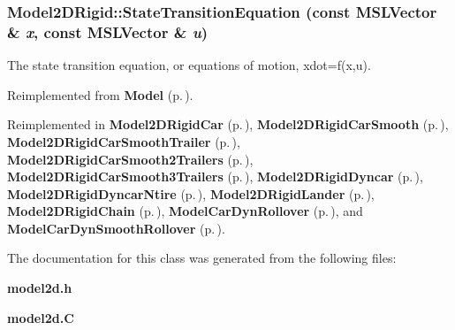 \subsubsection{ Model2DRigid::State\-Transition\-Equation (const {\bf MSLVector} \& {\em x}, const {\bf MSLVector} \& {\em u})\hspace{0.3cm}{\tt  [virtual]}}\label{classModel2DRigid_a3}


The state transition equation, or equations of motion, xdot=f(x,u).



Reimplemented from {\bf Model} {\rm (p.\,\pageref{classModel_a3})}.

Reimplemented in {\bf Model2DRigid\-Car} {\rm (p.\,\pageref{classModel2DRigidCar_a2})}, {\bf Model2DRigid\-Car\-Smooth} {\rm (p.\,\pageref{classModel2DRigidCarSmooth_a2})}, {\bf Model2DRigid\-Car\-Smooth\-Trailer} {\rm (p.\,\pageref{classModel2DRigidCarSmoothTrailer_a2})}, {\bf Model2DRigid\-Car\-Smooth2Trailers} {\rm (p.\,\pageref{classModel2DRigidCarSmooth2Trailers_a2})}, {\bf Model2DRigid\-Car\-Smooth3Trailers} {\rm (p.\,\pageref{classModel2DRigidCarSmooth3Trailers_a2})}, {\bf Model2DRigid\-Dyncar} {\rm (p.\,\pageref{classModel2DRigidDyncar_a4})}, {\bf Model2DRigid\-Dyncar\-Ntire} {\rm (p.\,\pageref{classModel2DRigidDyncarNtire_a2})}, {\bf Model2DRigid\-Lander} {\rm (p.\,\pageref{classModel2DRigidLander_a4})}, {\bf Model2DRigid\-Chain} {\rm (p.\,\pageref{classModel2DRigidChain_a3})}, {\bf Model\-Car\-Dyn\-Rollover} {\rm (p.\,\pageref{classModelCarDynRollover_a3})}, and {\bf Model\-Car\-Dyn\-Smooth\-Rollover} {\rm (p.\,\pageref{classModelCarDynSmoothRollover_a2})}.

The documentation for this class was generated from the following files:\begin{CompactItemize}
\item 
{\bf model2d.h}\item 
{\bf model2d.C}\end{CompactItemize}
